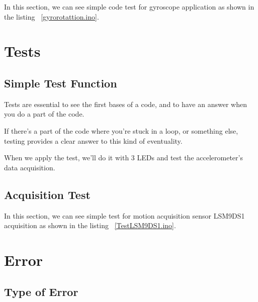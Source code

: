 In this section, we can see simple code test for gyroscope application as shown in the listing ~\ref{gyrorotattion.ino}.

{
	
	\label{gyrorotattion.ino}
}

\section{Tests}
\subsection{Simple Test Function}
Tests are essential to see the first bases of a code, and to have an answer when you do a part of the code. 

If there's a part of the code where you're stuck in a loop, or something else, testing provides a clear answer to this kind of eventuality. 

When we apply the test, we'll do it with 3 LEDs and test the accelerometer's data acquisition. 

\subsection{Acquisition Test}

In this section, we can see simple test for motion acquisition sensor LSM9DS1 acquisition as shown in the listing ~\ref{TestLSM9DS1.ino}.

{
	
	\label{TestLSM9DS1.ino}
	
}


\section{Error}
\subsection{Type of Error}

